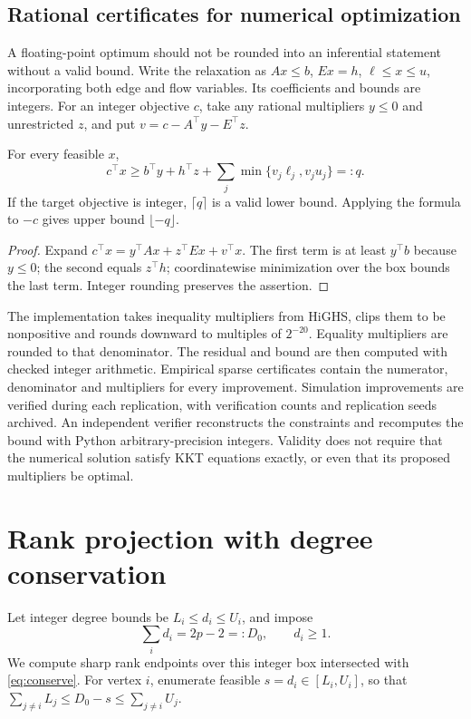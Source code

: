 \documentclass[11pt]{article}
\theoremstyle{plain}
\theoremstyle{definition}\newtheorem{remark}{Remark}\newtheorem{example}{Example}
\begin{document}
\subsection{Rational certificates for numerical optimization}\label{sec:dual}
A floating-point optimum should not be rounded into an inferential statement without a valid bound. Write the relaxation as $Ax\le b$, $Ex=h$, $\ell\le x\le u$, incorporating both edge and flow variables. Its coefficients and bounds are integers. For an integer objective $c$, take any rational multipliers $y\le0$ and unrestricted $z$, and put $v=c-A^\top y-E^\top z$.
\begin{proposition}\label{prop:dual}
For every feasible $x$,
\begin{equation}\label{eq:dual}
 c^\top x\ge b^\top y+h^\top z+\sum_j\min\{v_j\ell_j,v_ju_j\}=:q.
\end{equation}
If the target objective is integer, $\lceil q\rceil$ is a valid lower bound. Applying the formula to $-c$ gives upper bound $\lfloor-q\rfloor$.
\end{proposition}
\begin{proof}
Expand $c^\top x=y^\top Ax+z^\top Ex+v^\top x$. The first term is at least $y^\top b$ because $y\le0$; the second equals $z^\top h$; coordinatewise minimization over the box bounds the last term. Integer rounding preserves the assertion.
\end{proof}
The implementation takes inequality multipliers from HiGHS, clips them to be nonpositive and rounds downward to multiples of $2^{-20}$. Equality multipliers are rounded to that denominator. The residual and bound are then computed with checked integer arithmetic. Empirical sparse certificates contain the numerator, denominator and multipliers for every improvement. Simulation improvements are verified during each replication, with verification counts and replication seeds archived. An independent verifier reconstructs the constraints and recomputes the bound with Python arbitrary-precision integers. Validity does not require that the numerical solution satisfy KKT equations exactly, or even that its proposed multipliers be optimal.

\section{Rank projection with degree conservation}\label{sec:rank}
Let integer degree bounds be $L_i\le d_i\le U_i$, and impose
\begin{equation}\label{eq:conserve}
 \sum_i d_i=2p-2=:D_0,\qquad d_i\ge1.
\end{equation}
We compute sharp rank endpoints over this integer box intersected with \eqref{eq:conserve}. For vertex $i$, enumerate feasible $s=d_i\in[L_i,U_i]$, so that $\sum_{j\ne i}L_j\le D_0-s\le\sum_{j\ne i}U_j$.
\end{document}
